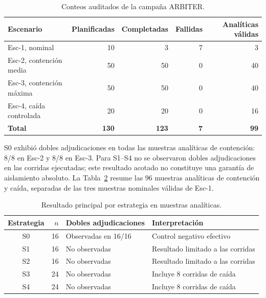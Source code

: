 \begin{table}[ht]
  \centering
  \small
  \caption{Conteos auditados de la campaña ARBITER.}
  \label{tab:arbiter-conteos}
  \begin{tabular}{|l|r|r|r|r|}
    \hline
    \textbf{Escenario} & \textbf{Planificadas} & \textbf{Completadas} & \textbf{Fallidas} & \textbf{Analíticas válidas} \\
    \hline
    Esc-1, nominal & 10 & 3 & 7 & 3 \\
    \hline
    Esc-2, contención media & 50 & 50 & 0 & 40 \\
    \hline
    Esc-3, contención máxima & 50 & 50 & 0 & 40 \\
    \hline
    Esc-4, caída controlada & 20 & 20 & 0 & 16 \\
    \hline
    \textbf{Total} & \textbf{130} & \textbf{123} & \textbf{7} & \textbf{99} \\
    \hline
  \end{tabular}
\end{table}

S0 exhibió dobles adjudicaciones en todas las muestras analíticas de
contención: 8/8 en Esc-2 y 8/8 en Esc-3. Para S1--S4 no se observaron dobles
adjudicaciones en las corridas ejecutadas; este resultado acotado no constituye
una garantía de aislamiento absoluto. La Tabla~\ref{tab:arbiter-estrategias}
resume las 96 muestras analíticas de contención y caída, separadas de las tres
muestras nominales válidas de Esc-1.

\begin{table}[ht]
  \centering
  \small
  \caption{Resultado principal por estrategia en muestras analíticas.}
  \label{tab:arbiter-estrategias}
  \begin{tabular}{|c|r|l|l|}
    \hline
    \textbf{Estrategia} & \textbf{$n$} & \textbf{Dobles adjudicaciones} & \textbf{Interpretación} \\
    \hline
    S0 & 16 & Observadas en 16/16 & Control negativo efectivo \\
    \hline
    S1 & 16 & No observadas & Resultado limitado a las corridas \\
    \hline
    S2 & 16 & No observadas & Resultado limitado a las corridas \\
    \hline
    S3 & 24 & No observadas & Incluye 8 corridas de caída \\
    \hline
    S4 & 24 & No observadas & Incluye 8 corridas de caída \\
    \hline
  \end{tabular}
\end{table}

